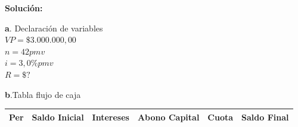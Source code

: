 \vspace{2mm}

\textbf{Solución:}

\textbf{a}. Declaración de variables\\


	    $VP=\$3.000.000,00$
	    \\
	    $	n=42 pmv$ 
	    \\
		$i=3,0\% pmv$
		\\
				$R=\$?$

\clearpage

\textbf{b}.Tabla flujo de caja
\begin{spacing}{1.1}
    \begin{center}
        \begin{tabular}{|p{1cm}|p{}|p{}|p{}|p{}|p{}|}
        \hline 
            \textbf{Per} & \textbf{Saldo Inicial} & \textbf{Intereses}& \textbf{Abono Capital} & \textbf{Cuota}& \textbf{Saldo Final}   \\ \hline                        

           
           

\end{tabular}
\end{center}
\end{spacing}

